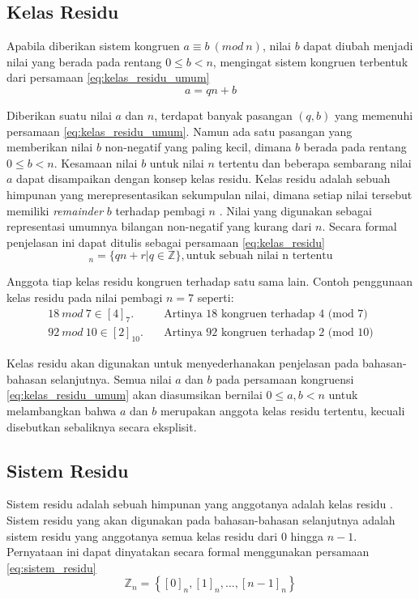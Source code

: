 \subsection{Kelas Residu}
Apabila diberikan sistem kongruen $a\equiv b\ (mod\ n)$, nilai $b$ dapat diubah menjadi nilai yang berada pada rentang $0\le b<n$, mengingat sistem kongruen terbentuk dari persamaan \eqref{eq:kelas_residu_umum}
\begin{equation}
a=qn+b
\label{eq:kelas_residu_umum}
\end{equation}

Diberikan suatu nilai $a$ dan $n$, terdapat banyak pasangan $(q,b)$ yang memenuhi persamaan \eqref{eq:kelas_residu_umum}. Namun ada satu pasangan yang memberikan nilai $b$ non-negatif yang paling kecil, dimana $b$ berada pada rentang $0\le b<n$. Kesamaan nilai $b$ untuk nilai $n$ tertentu dan beberapa sembarang nilai $a$ dapat disampaikan dengan konsep kelas residu.
Kelas residu adalah sebuah himpunan yang merepresentasikan sekumpulan nilai, dimana setiap nilai tersebut memiliki \textit{remainder} $b$ terhadap pembagi $n$ \cite{cormen_introduction,stallings_cryptography}. Nilai yang digunakan sebagai representasi umumnya bilangan non-negatif yang kurang dari $n$. Secara formal penjelasan ini dapat ditulis sebagai persamaan \eqref{eq:kelas_residu}
\begin{equation}
[r]_n=\{qn+r | q\in \mathbb{Z}\}, \text{untuk sebuah nilai n tertentu}
\label{eq:kelas_residu}
\end{equation}

Anggota tiap kelas residu kongruen terhadap satu sama lain. Contoh penggunaan kelas residu pada nilai pembagi $n = 7$ seperti:
\begin{align*}
18\ mod\ 7\in [4]_7. \quad& \text{Artinya 18 kongruen terhadap 4 (mod 7)} \\
92\ mod\ 10\in [2]_{10}. \quad& \text{Artinya 92 kongruen terhadap 2 (mod 10)}
\end{align*}

Kelas residu akan digunakan untuk menyederhanakan penjelasan pada bahasan-bahasan selanjutnya. Semua nilai $a$ dan $b$ pada persamaan kongruensi \eqref{eq:kelas_residu_umum} akan diasumsikan bernilai $0\leq a,b < n$ untuk melambangkan bahwa $a$ dan $b$ merupakan anggota kelas residu tertentu, kecuali disebutkan sebaliknya secara eksplisit.

\subsection{Sistem Residu}
Sistem residu adalah sebuah himpunan yang anggotanya adalah kelas residu \cite{stallings_cryptography,cormen_introduction}. Sistem residu yang akan digunakan pada bahasan-bahasan selanjutnya adalah sistem residu yang anggotanya semua kelas residu dari 0 hingga $n - 1$. Pernyataan ini dapat dinyatakan secara formal menggunakan persamaan \eqref{eq:sistem_residu}
\begin{equation}
\mathbb{Z}_n=\left\lbrace[0]_n,[1]_n,\dots,[n-1]_n\right\rbrace
\label{eq:sistem_residu}
\end{equation}

